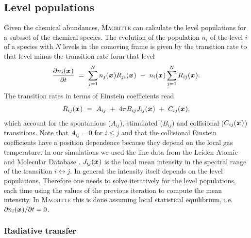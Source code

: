 \documentclass[a4paper,fleqn,usenatbib]{mnras}
\newcommand{\x}{{\textit{\textbf{x}}}\,}
\begin{document}
\subsection{Level populations}
Given the chemical abundances, \textsc{Magritte} can calculate the level populations for a subsset of the chemical species. The evolution of the population $n_{i}$ of the level $i$ of a species with $N$ levels in the comoving frame is given by the transition rate to that level minus the transition rate form that level
\begin{equation}
	\frac{\partial n_{i}(\x)}{\partial t} \ = \
	\sum_{j=1}^{N} n_{j}(\x) R_{ji}(\x) \ - \ n_{i}(\x) \sum_{j=1}^{N} R_{ij}(\x) .
\label{levelpop}
\end{equation}
The transition rates in terms of Einstein coefficients read
\begin{equation}
	R_{ij}(\x) \ = \ A_{ij} \ + \ 4\pi B_{ij}  J_{ij}(\x) \ + \ C_{ij}(\x),
\end{equation}
which account for the spontanious ($A_{ij}$), stimulated ($B_{ij}$) and collisional ($C_{ij}(\x)$) transitions. Note that $A_{ij}=0$ for $i \leq j$ and that the collisional Einstein coefficients have a position dependence because they depend on the local gas temperature. In our simulations we used the line data from the Leiden Atomic and Molecular Database \citep[LAMDA,][]{Schoier2005}. $J_{ij}(\x)$ is the local mean intensity in the spectral range of the transition $i \leftrightarrow j$. In general the intensity itself depends on the level populations. Therefore one needs to solve iteratively for the level populations, each time using the values of the previous iteration to compute the mean intensity. In \textsc{Magritte} this is done assuming local statistical equilibrium, i.e. $\partial n_{i}(\x)/\partial t = 0$.



\subsubsection{Radiative transfer}
\end{document}
